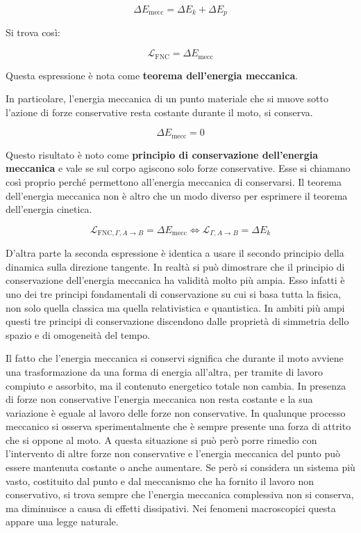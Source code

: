 \[
	\boxed{\Delta E_{\text{mecc}}=\Delta E_k + \Delta E_p}
\]

Si trova così:

\[
	\mathcal{L}_{\text{FNC}}=\Delta E_\text{mecc}
\]

Questa espressione è nota come \textbf{teorema dell'energia meccanica}.

In particolare, l'energia meccanica di un punto materiale che si muove sotto l'azione di forze conservative resta costante durante il moto, si conserva.

\[
	\Delta E_{\text{mecc}}=0
\]

Questo risultato è noto come \textbf{principio di conservazione dell'energia meccanica} e vale se sul corpo agiscono solo forze conservative. Esse si chiamano così proprio perché permettono all'energia meccanica di conservarsi. Il teorema dell'energia meccanica non è altro che un modo diverso per esprimere il teorema dell'energia cinetica.

\[
	\boxed{\mathcal{L}_{\text{FNC}, \Gamma, A \to B}= \Delta E_{\text{mecc}} \iff \mathcal{L}_{\Gamma, A \to B}= \Delta E_k}
\]

D'altra parte la seconda espressione è identica a usare il secondo principio della dinamica sulla direzione tangente. In realtà si può dimostrare che il principio di conservazione dell'energia meccanica ha validità molto più ampia. Esso infatti è uno dei tre principi fondamentali di conservazione su cui si basa tutta la fisica, non solo quella classica ma quella relativistica e quantistica. In ambiti più ampi questi tre principi di conservazione discendono dalle proprietà di simmetria dello spazio e di omogeneità del tempo.

Il fatto che l'energia meccanica si conservi significa che durante il moto avviene una trasformazione da una forma di energia all'altra, per tramite di lavoro compiuto e assorbito, ma il contenuto energetico totale non cambia.
In presenza di forze non conservative l'energia meccanica non resta costante e la sua variazione è eguale al lavoro delle forze non conservative. In qualunque processo meccanico si osserva sperimentalmente che è sempre presente una forza di attrito che si oppone al moto. A questa situazione si può però porre rimedio con l'intervento di altre forze non conservative e l'energia meccanica del punto può essere mantenuta costante o anche aumentare. Se però si considera un sistema più vasto, costituito dal punto e dal meccanismo che ha fornito il lavoro non conservativo, si trova sempre che l'energia meccanica complessiva non si conserva, ma diminuisce a causa di effetti dissipativi. Nei fenomeni macroscopici questa appare una legge naturale.

